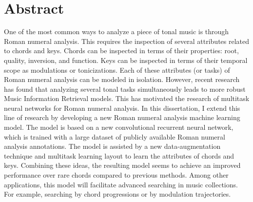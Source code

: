 \chapter*{Abstract}
\label{chap:abstract-en}

One of the most common ways to analyze a piece of tonal
music is through Roman numeral analysis. This requires the
inspection of several attributes related to chords and keys.
Chords can be inspected in terms of their properties: root,
quality, inversion, and function. Keys can be inspected in
terms of their temporal scope as modulations or
tonicizations. Each of these attributes (or tasks) of Roman
numeral analysis can be modeled in isolation. However,
recent research has found that analyzing several tonal tasks
simultaneously leads to more robust Music Information
Retrieval models. This has motivated the research of
multitask neural networks for Roman numeral analysis.
In this dissertation, I extend this line of research by
developing a new Roman numeral analysis machine learning
model. The model is based on a new convolutional recurrent
neural network, which is trained with a large dataset of
publicly available Roman numeral analysis annotations. The
model is assisted by a new data-augmentation technique and
multitask learning layout to learn the attributes of chords
and keys. Combining these ideas, the resulting model seems
to achieve an improved performance over rare chords compared
to previous methods. Among other applications, this model
will facilitate advanced searching in music collections. For
example, searching by chord progressions or by modulation
trajectories.
